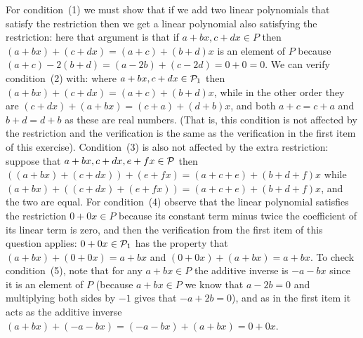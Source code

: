 \begin{exercises}
\begin{answer}
\begin{exparts}
          For condition~(1) we must show that
          if we add two linear polynomials that satisfy the restriction then
          we get a linear polynomial also satisfying the restriction: here that
          argument is that
          if $a+bx,c+dx\in P$ then
          $(a+bx)+(c+dx)=(a+c)+(b+d)x$ is an element of $P$ because
          $(a+c)-2(b+d)=(a-2b)+(c-2d)=0+0=0$. 
          We can verify condition~(2) with: 
          where $a+bx,c+dx\in\mathcal{P}_1$ then 
          $(a+bx)+(c+dx)=(a+c)+(b+d)x$, while in the other order they are
          $(c+dx)+(a+bx)=(c+a)+(d+b)x$, and both $a+c=c+a$ 
          and $b+d=d+b$ as these are real numbers. 
          (That is, this condition
          is not affected by the restriction and the verification is the same 
          as the verification in the first item of this exercise).
          Condition~(3) is also not affected by the extra restriction: 
          suppose that
          $a+bx,c+dx,e+fx\in\mathcal{P}$ then
          $((a+bx)+(c+dx))+(e+fx)=(a+c+e)+(b+d+f)x$
          while
          $(a+bx)+((c+dx)+(e+fx))=(a+c+e)+(b+d+f)x$, and the two are equal.
          For condition~(4) observe that the linear polynomial
          satisfies the restriction $0+0x\in P$ because
          its constant term minus twice the coefficient of its linear term
          is zero, and then the verification from the first item of this 
          question applies:
          $0+0x\in\mathcal{P}_1$ has the 
          property that $(a+bx)+(0+0x)=a+bx$ and 
          $(0+0x)+(a+bx)=a+bx$.
          To check condition~(5),
          note that for any $a+bx\in P$ the additive inverse
          is $-a-bx$ since
          it is an element of $P$ (because $a+bx\in P$ we know that 
          $a-2b=0$ and multiplying both sides by $-1$ gives that $-a+2b=0$), 
          and as in the first item it acts as the additive inverse
          $(a+bx)+(-a-bx)=(-a-bx)+(a+bx)=0+0x$.
         

\end{exparts}
\end{answer}
\end{exercises}
